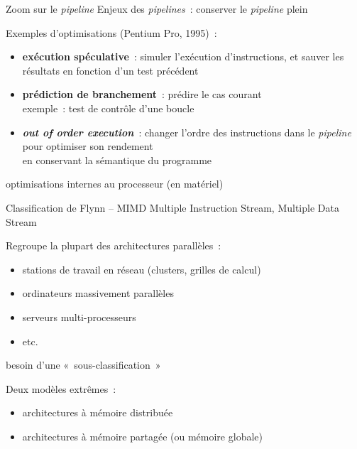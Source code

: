 \begin {frame} {Zoom sur le \emph {pipeline}}
    Enjeux des \emph {pipelines}~: conserver le \emph {pipeline}
    plein

    \vspace* {5mm}

    Exemples d'optimisations (Pentium Pro, 1995)~:

    \begin {itemize}
	\item \textbf {exécution spéculative}~: simuler l'exécution
	    d'instructions, et sauver les résultats en fonction
	    d'un test précédent
	\item \textbf {prédiction de branchement}~: prédire le cas
	    courant \\
	    \implique exemple~: test de contrôle d'une boucle 
	\item \textbf {\emph {out of order execution}}~: changer l'ordre
	    des instructions dans le \emph {pipeline} pour optimiser son
	    rendement
	    \\
	    \implique en conservant la sémantique du programme

    \end {itemize}

    \implique optimisations internes au processeur (en matériel)
\end {frame}

\begin {frame} {Classification de Flynn -- MIMD}
    Multiple Instruction Stream, Multiple Data Stream

    \vspace* {3mm}

    Regroupe la plupart des architectures parallèles~:

    \begin {itemize}
	\item stations de travail en réseau (clusters, grilles de calcul)
	\item ordinateurs massivement parallèles
	\item serveurs multi-processeurs
	\item etc.
    \end {itemize}

    \implique besoin d'une «~sous-classification~»

    \vspace* {3mm}

    Deux modèles extrêmes~:

    \begin {itemize}
	\item architectures à mémoire distribuée
	\item architectures à mémoire partagée (ou mémoire globale)
    \end {itemize}

\end {frame}


